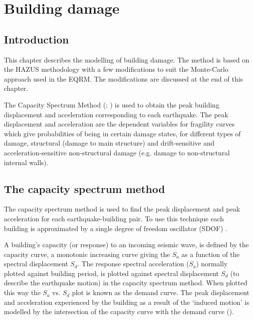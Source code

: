 \chapter{Building damage}
\label{ch:damage}

\section{Introduction}
\label{sec:v-dam-intro}

This chapter describes the modelling of building damage. The
method is based on the HAZUS methodology \citep{dr_FEMA99b} with a
few modifications to suit the Monte-Carlo approach used in the
EQRM. The modifications are discussed at the end of this chapter.

The Capacity Spectrum Method
(\citealp{dr_FEMA99b}; \citealp{dr_Kircher97a}) is used to obtain
the peak building displacement and acceleration corresponding to
each earthquake. The peak displacement
and acceleration are the dependent variables for fragility
curves \citep{dr_Kircher97a} which give
probabilities of being in certain damage states, for different
types of damage, structural (damage to main structure) and
drift-sensitive and acceleration-sensitive non-structural damage
(e.g. damage to non-structural internal walls).


\section{The capacity spectrum method}
\label{sec:v-dam-capspect}

The capacity spectrum method is
used to find the peak displacement and
peak acceleration for each
earthquake-building pair. To use this technique each building is
approximated by a single degree of freedom oscillator (SDOF)
\citep{dr_Chopra01c}.

A building's capacity (or response) to an incoming seismic wave,
is defined by the capacity curve, a
monotonic increasing curve giving the $S_a$ as a function of the
spectral displacement $S_d$.
The response spectral acceleration ($S_a$) normally plotted against building period, is
plotted against spectral displacement $S_d$ (to describe the earthquake motion) in the capacity spectrum method. When
plotted this way the $S_a$ vs. $S_d$ plot is known as the demand
curve. The peak displacement and acceleration experienced by the building as a
result of the `induced motion' is modelled by the intersection of
the capacity curve with the demand
curve ().

